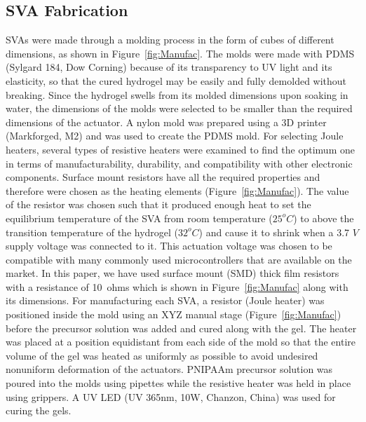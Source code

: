 \subsection{SVA Fabrication}
SVAs were made through a molding process in the form of cubes of different dimensions, as shown in Figure~\ref{fig:Manufac}. The molds were made with PDMS (Sylgard 184, Dow Corning) because of its transparency to UV light and its elasticity, so that the cured hydrogel may be easily and fully demolded without breaking. Since the hydrogel swells from its molded dimensions upon soaking in water, the dimensions of the molds were selected to be smaller than the required dimensions of the actuator. A nylon mold was prepared using a 3D printer (Markforged, M2) and was used to create the PDMS mold. For selecting Joule heaters, several types of resistive heaters were examined to find the optimum one in terms of manufacturability, durability, and compatibility with other electronic components. Surface mount resistors have all the required properties and therefore were chosen as the heating elements (Figure~\ref{fig:Manufac}). The value of the resistor was chosen such that it produced enough heat to set the equilibrium temperature of the SVA from room temperature ($25^{o}C$) to above the transition temperature of the hydrogel ($32^{o}C$) and cause it to shrink when a 3.7 $V$ supply voltage was connected to it. This actuation voltage was chosen to be compatible with many commonly used microcontrollers that are available on the market. In this paper, we have used surface mount 
(SMD) thick film resistors with a resistance of 10~ohms which is shown in Figure~\ref{fig:Manufac} along with its dimensions.  For manufacturing each SVA, a resistor (Joule heater) was positioned inside the mold using an XYZ manual stage (Figure~\ref{fig:Manufac}) before the precursor solution was added and cured along with the gel. The heater was placed at a position equidistant from each side of the mold so that the entire volume of the gel was heated as uniformly as possible to avoid undesired nonuniform deformation of the actuators. PNIPAAm precursor solution was poured into the molds using pipettes while the resistive heater was held in place using grippers. A UV LED (UV 365nm, 10W, Chanzon, China) was used for curing the gels. 

